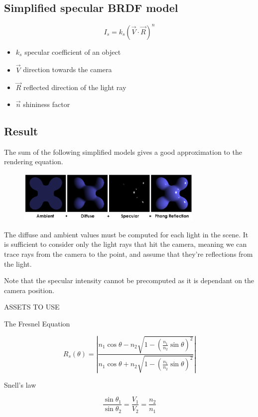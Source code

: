 \documentclass[a4paper]{article}
\begin{document}
\subsection{Simplified specular BRDF model}

\[
    I_s=k_s {(\vec{V} \cdot \vec{R})}^n
\]

\begin{itemize}
    \item \(k_s\) specular coefficient of an object
    \item \(\vec{V}\) direction towards the camera
    \item \(\vec{R}\) reflected direction of the light ray
    \item \(\vec{n}\) shininess factor
\end{itemize}

\pagebreak

\subsection{Result}

The sum of the following simplified models
gives a good approximation to the rendering equation.

\begin{figure}[h]
    \centering
    \includegraphics[width=0.8\textwidth]{resources/phong.png}
\end{figure}

The diffuse and ambient values must be computed for each light in the scene.
It is sufficient to consider only the light rays that hit the camera, meaning
we can trace rays from the camera to the point, and assume that they're reflections
from the light.

Note that the specular intensity cannot be precomputed as it is dependant
on the camera position.

\pagebreak

ASSETS TO USE


The Fresnel Equation

\[
    R_s(\theta) =
        \left|
            \frac
            {
                n_1\cos \theta - n_2 \sqrt{1-{\left(\frac{n_1}{n_2}\sin \theta\right)}^2}
            }
            {
                n_1\cos \theta + n_2 \sqrt{1-{\left(\frac{n_1}{n_2}\sin \theta\right)}^2}
            }
        \right|
\]

Snell's law

\[
    \frac{\sin \theta_1}{\sin \theta_2}
    = \frac{V_1}{V_2}
    = \frac{n_2}{n_1}
\]

\pagebreak

\nocite{*} %

\printbibliography
\end{document}
